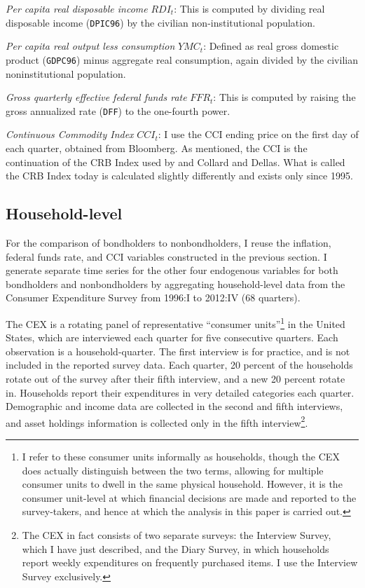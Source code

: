 \textit{Per capita real disposable income} $RDI_t$: This is computed by dividing real disposable income (\texttt{DPIC96}) by the civilian non-institutional population.

\textit{Per capita real output less consumption} $YMC_t$: Defined as real gross domestic product (\texttt{GDPC96}) minus aggregate real consumption, again divided by the civilian noninstitutional population.

\textit{Gross quarterly effective federal funds rate} $FFR_t$: This is computed by raising the gross annualized rate (\texttt{DFF}) to the one-fourth power.

\textit{Continuous Commodity Index} $CCI_t$: I use the CCI ending price on the first day of each quarter, obtained from Bloomberg. As mentioned, the CCI is the continuation of the CRB Index used by \cite{canzoneri07} and Collard and Dellas. What is called the CRB Index today is calculated slightly differently and exists only since 1995.



\subsection{Household-level}
For the comparison of bondholders to nonbondholders, I reuse the inflation, federal funds rate, and CCI variables constructed in the previous section. I generate separate time series for the other four endogenous variables for both bondholders and nonbondholders by aggregating household-level data from the Consumer Expenditure Survey from 1996:I to 2012:IV (68 quarters).

The CEX is a rotating panel of representative ``consumer units''\footnote{I refer to these consumer units informally as households, though the CEX does actually distinguish between the two terms, allowing for multiple consumer units to dwell in the same physical household. However, it is the consumer unit-level at which financial decisions are made and reported to the survey-takers, and hence at which the analysis in this paper is carried out.} in the United States, which are interviewed each quarter for five consecutive quarters. Each observation is a household-quarter. The first interview is for practice, and is not included in the reported survey data. Each quarter, 20 percent of the households rotate out of the survey after their fifth interview, and a new 20 percent rotate in. Households report their expenditures in very detailed categories each quarter. Demographic and income data are collected in the second and fifth interviews, and asset holdings information is collected only in the fifth interview\footnote{The CEX in fact consists of two separate surveys: the Interview Survey, which I have just described, and the Diary Survey, in which households report weekly expenditures on frequently purchased items. I use the Interview Survey exclusively.}.


